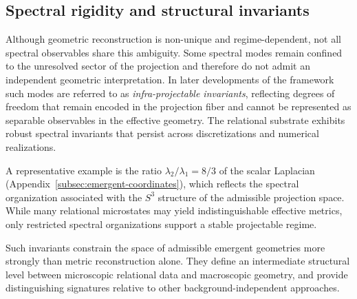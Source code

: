 \subsection{Spectral rigidity and structural invariants}
  \label{subsec:spectral-rigidity-and-structural-invariants}

  Although geometric reconstruction is non-unique and regime-dependent,
  not all spectral observables share this ambiguity.
  Some spectral modes remain confined to the unresolved sector of the
  projection and therefore do not admit an independent geometric
  interpretation.
  In later developments of the framework such modes are referred to as
  \emph{infra-projectable invariants}, reflecting degrees of freedom that
  remain encoded in the projection fiber and cannot be represented as
  separable observables in the effective geometry.
  The relational substrate exhibits robust spectral invariants
  that persist across discretizations and numerical realizations.

  A representative example is the ratio
  $\lambda_2/\lambda_1 = 8/3$ of the scalar Laplacian
  (Appendix~\ref{subsec:emergent-coordinates}),
  which reflects the spectral organization associated with the
  $S^3$ structure of the admissible projection space.
  While many relational microstates may yield indistinguishable
  effective metrics, only restricted spectral organizations
  support a stable projectable regime.

  Such invariants constrain the space of admissible emergent
  geometries more strongly than metric reconstruction alone.
  They define an intermediate structural level between
  microscopic relational data and macroscopic geometry,
  and provide distinguishing signatures relative to other
  background-independent approaches.
